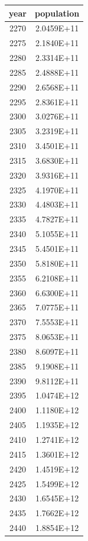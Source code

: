 \documentclass[a4paper]{article}
\begin{document}
	\begin{tabular}{|c|c|}
		\hline
		year & population \\
		\hline
		2270 & 2.0459E+11 \\
		\hline
		2275 & 2.1840E+11 \\
		\hline
		2280 & 2.3314E+11 \\
		\hline
		2285 & 2.4888E+11 \\
		\hline
		2290 & 2.6568E+11 \\
		\hline
		2295 & 2.8361E+11 \\
		\hline
		2300 & 3.0276E+11 \\
		\hline
		2305 & 3.2319E+11 \\
		\hline
		2310 & 3.4501E+11 \\
		\hline
		2315 & 3.6830E+11 \\
		\hline
		2320 & 3.9316E+11 \\
		\hline
		2325 & 4.1970E+11 \\
		\hline
		2330 & 4.4803E+11 \\
		\hline
		2335 & 4.7827E+11 \\
		\hline
		2340 & 5.1055E+11 \\
		\hline
		2345 & 5.4501E+11 \\
		\hline
		2350 & 5.8180E+11 \\
		\hline
		2355 & 6.2108E+11 \\
		\hline
		2360 & 6.6300E+11 \\
		\hline
		2365 & 7.0775E+11 \\
		\hline
		2370 & 7.5553E+11 \\
		\hline
		2375 & 8.0653E+11 \\
		\hline
		2380 & 8.6097E+11 \\
		\hline
		2385 & 9.1908E+11 \\
		\hline
		2390 & 9.8112E+11 \\
		\hline
		2395 & 1.0474E+12 \\
		\hline
		2400 & 1.1180E+12 \\
		\hline
		2405 & 1.1935E+12 \\
		\hline
		2410 & 1.2741E+12 \\
		\hline
		2415 & 1.3601E+12 \\
		\hline
		2420 & 1.4519E+12 \\
		\hline
		2425 & 1.5499E+12 \\
		\hline
		2430 & 1.6545E+12 \\
		\hline
		2435 & 1.7662E+12 \\
		\hline
		2440 & 1.8854E+12 \\

\end{tabular}
\end{document}
